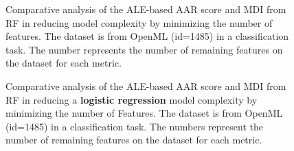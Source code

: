 \begin{figure}[ht!]
\centering
  \caption{Comparative analysis of the ALE-based AAR score and MDI from RF in reducing model complexity by minimizing the number of features. The dataset is from OpenML (id=1485) in a classification task. The number represents the number of remaining features on the dataset for each metric.}
    \label{fig:opemML312}
\end{figure}

\begin{figure}[ht!]
\centering
  \caption{Comparative analysis of the ALE-based AAR score and MDI from RF in reducing a \textbf{logistic regression} model complexity by minimizing the number of Features. The dataset is from OpenML (id=1485) in a classification task. The numbers represent the number of remaining features on the dataset for each metric.}
    \label{fig:opemML312_lr}
\end{figure}





